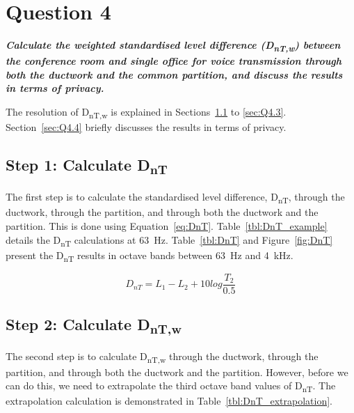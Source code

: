 \section{Question 4}

\textbf{\textit{Calculate the weighted standardised level difference (D\textsubscript{nT,w}) between the conference room and single office for voice transmission through both the ductwork and the common partition, and discuss the results in terms of privacy.}}


The resolution of D\textsubscript{nT,w} is explained in Sections~\ref{sec:Q4.1} to \ref{sec:Q4.3}.
Section~\ref{sec:Q4.4} briefly discusses the results in terms of privacy.



\subsection{Step 1: Calculate D\textsubscript{nT}} \label{sec:Q4.1}

The first step is to calculate the standardised level difference, D\textsubscript{nT}, through the ductwork, through the partition, and through both the ductwork and the partition.
This is done using Equation~\ref{eq:DnT}.
Table~\ref{tbl:DnT_example} details the D\textsubscript{nT} calculations at 63~Hz.
Table~\ref{tbl:DnT} and Figure~\ref{fig:DnT} present the D\textsubscript{nT} results in octave bands between 63~Hz and 4~kHz.

	\begin{equation}\label{eq:DnT}
		D_{nT} = L_1 - L_2 + 10 log \frac{T_2}{0.5}
	\end{equation}









\subsection{Step 2: Calculate D\textsubscript{nT,w}} \label{sec:Q4.2}

The second step is to calculate D\textsubscript{nT,w} through the ductwork, through the partition, and through both the ductwork and the partition.
However, before we can do this, we need to extrapolate the third octave band values of D\textsubscript{nT}.
The extrapolation calculation is demonstrated in Table~\ref{tbl:DnT_extrapolation}.

